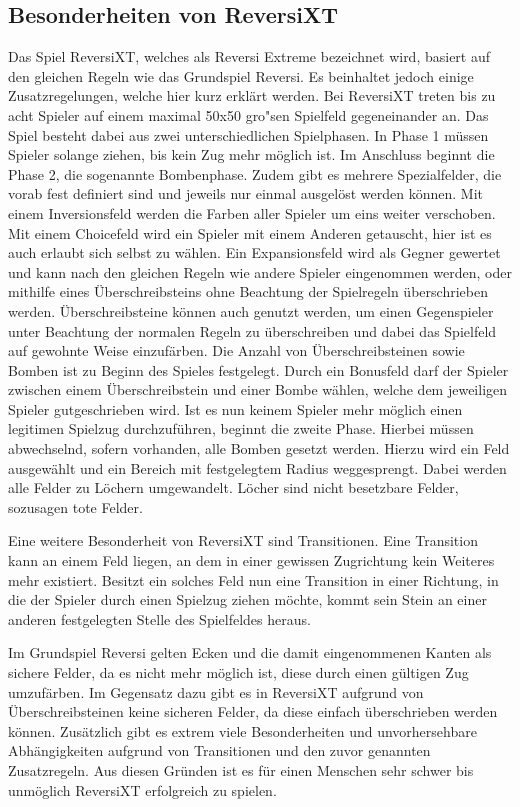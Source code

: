 \subsection{Besonderheiten von ReversiXT}\label{subsec:besonderheiten-von-reversixt}
Das Spiel ReversiXT, welches als Reversi Extreme bezeichnet wird, basiert auf den gleichen Regeln wie das Grundspiel Reversi.
Es beinhaltet jedoch einige Zusatzregelungen, welche hier kurz erkl\"art werden.
Bei ReversiXT treten bis zu acht Spieler auf einem maximal 50x50 gro"sen Spielfeld gegeneinander an.
Das Spiel besteht dabei aus zwei unterschiedlichen Spielphasen.
In Phase 1 m\"ussen Spieler solange ziehen, bis kein Zug mehr m\"oglich ist.
Im Anschluss beginnt die Phase 2, die sogenannte Bombenphase.
Zudem gibt es mehrere Spezialfelder, die vorab fest definiert sind und jeweils nur einmal ausgel\"ost werden k\"onnen.
Mit einem Inversionsfeld werden die Farben aller Spieler um eins weiter verschoben.
Mit einem Choicefeld wird ein Spieler mit einem Anderen getauscht, hier ist es auch erlaubt sich selbst zu w\"ahlen.
Ein Expansionsfeld wird als Gegner gewertet und kann nach den gleichen Regeln wie andere Spieler eingenommen werden, oder mithilfe eines \"Uberschreibsteins ohne Beachtung der Spielregeln \"uberschrieben werden.
\"Uberschreibsteine k\"onnen auch genutzt werden, um einen Gegenspieler unter Beachtung der normalen Regeln zu \"uberschreiben und dabei das Spielfeld auf gewohnte Weise einzuf\"arben.
Die Anzahl von \"Uberschreibsteinen sowie Bomben ist zu Beginn des Spieles festgelegt.
Durch ein Bonusfeld darf der Spieler zwischen einem \"Uberschreibstein und einer Bombe w\"ahlen, welche dem jeweiligen Spieler gutgeschrieben wird.
Ist es nun keinem Spieler mehr m\"oglich einen legitimen Spielzug durchzuf\"uhren, beginnt die zweite Phase.
Hierbei m\"ussen abwechselnd, sofern vorhanden, alle Bomben gesetzt werden.
Hierzu wird ein Feld ausgew\"ahlt und ein Bereich mit festgelegtem Radius weggesprengt.
Dabei werden alle Felder zu L\"ochern umgewandelt.
L\"ocher sind nicht besetzbare Felder, sozusagen tote Felder.

Eine weitere Besonderheit von ReversiXT sind Transitionen.
Eine Transition kann an einem Feld liegen, an dem in einer gewissen Zugrichtung kein Weiteres mehr existiert.
Besitzt ein solches Feld nun eine Transition in einer Richtung, in die der Spieler durch einen Spielzug ziehen m\"ochte, kommt sein Stein an einer anderen festgelegten Stelle des Spielfeldes heraus.

Im Grundspiel Reversi gelten Ecken und die damit eingenommenen Kanten als sichere Felder, da es nicht mehr m\"oglich ist, diese durch einen g\"ultigen Zug umzuf\"arben.
Im Gegensatz dazu gibt es in ReversiXT aufgrund von \"Uberschreibsteinen keine sicheren Felder, da diese einfach \"uberschrieben werden k\"onnen.
Zus\"atzlich gibt es extrem viele Besonderheiten und unvorhersehbare Abh\"angigkeiten aufgrund von Transitionen und den zuvor genannten Zusatzregeln.
Aus diesen Gr\"unden ist es f\"ur einen Menschen sehr schwer bis unm\"oglich ReversiXT erfolgreich zu spielen.

